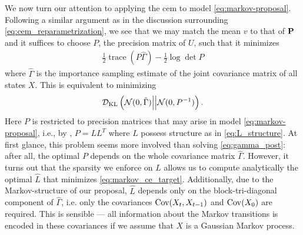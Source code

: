 We now turn our attention to applying the \gls{cem} to model \eqref{eq:markov-proposal}. Following a similar argument as in the discussion surrounding \eqref{eq:cem_reparametrization}, we see that we may match the mean $v$ to that of $\P$ and it suffices to choose $P$, the precision matrix of $U$, such that it minimizes
\begin{align}
\label{eq:markov_ce_target}
\frac{1}{2} \operatorname{trace} \left( P \hat\Gamma \right) - \frac{1}{2}\log\det P
\end{align}
where $\hat\Gamma$ is the importance sampling estimate of the joint covariance matrix of all states $X$. This is equivalent to minimizing 
$$
\Dkl{\mathcal N(0,\hat\Gamma)}{\mathcal N(0, P^{-1})}.
$$
Here $P$ is restricted to precision matrices that may arise in model \eqref{eq:markov-proposal}, i.e., by , $P = LL^{T}$ where $L$ possess structure as in \eqref{eq:L_structure}. 
At first glance, this problem seems more involved than solving \eqref{eq:gamma_post}: after all, the optimal $P$ depends on the whole covariance matrix $\hat\Gamma$. 
However, it turns out that the sparsity we enforce on $L$ allows us to compute analytically the optimal $\hat L$  that minimizes 
\eqref{eq:markov_ce_target}. Additionally, due to the Markov-structure of our proposal, $\hat L$ depends only on the block-tri-diagonal component of $\hat \Gamma$, i.e. only the covariances $\cov(X_{t}, X_{t-1})$ and $\cov (X_{0})$ are required. This is sensible --- all information about the Markov transitions is encoded in these covariances if we assume that $X$ is a Gaussian Markov process.

